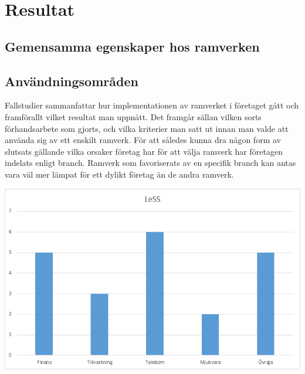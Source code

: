 	
	
\newpage
\section{Resultat}
	
		
	
	\subsection{Gemensamma egenskaper hos ramverken}
		
	
	\subsection{Användningsområden}

	Fallstudier sammanfattar hur implementationen av ramverket i företaget gått och framförallt vilket resultat man uppnått. Det framgår sällan vilken sorts förhandsarbete som gjorts, och vilka kriterier man satt ut innan man valde att använda sig av ett enskilt ramverk.
	För att således kunna dra någon form av slutsats gällande vilka orsaker företag har för att välja ramverk har företagen indelats enligt branch.
	Ramverk som favoriserats av en specifik branch kan antas vara väl mer lämpat för ett dylikt företag än de andra ramverk.

	
	\begin{center}
		\includegraphics{Grafer/LeSS_brancher.png}
	\end{center}
	

